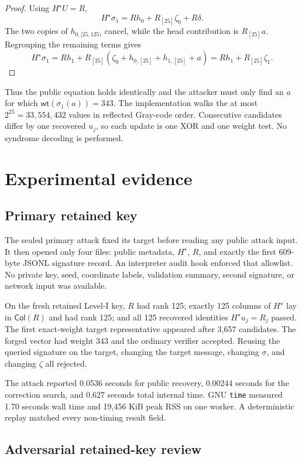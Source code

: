 \documentclass[10pt,a4paper]{article}
\newcommand{\Col}{\mathsf{Col}}
\newcommand{\wt}{\mathsf{wt}}
\begin{document}
\begin{proof}
Using $H^\star U=R$,
\[
H^\star\sigma_1
=Rh_0+R_{[25]}\zeta_0+R\delta.
\]
The two copies of $h_{0,[25,125)}$ cancel, while the head contribution is
$R_{[25]}a$. Regrouping the remaining terms gives
\[
H^\star\sigma_1
=Rh_1+R_{[25]}
 (\zeta_0+h_{0,[25]}+h_{1,[25]}+a)
=Rh_1+R_{[25]}\zeta_1.
\]
\end{proof}

Thus the public equation holds identically and the attacker must only find an
$a$ for which $\wt(\sigma_1(a))=343$. The implementation walks the at most
$2^{25}=33{,}554{,}432$ values in reflected Gray-code order. Consecutive
candidates differ by one recovered $u_j$, so each update is one XOR and one
weight test. No syndrome decoding is performed.

\section{Experimental evidence}

\subsection{Primary retained key}

The sealed primary attack fixed its target before reading any public attack
input. It then opened only four files: public metadata, $H^\star$, $R$, and
exactly the first 609-byte JSONL signature record. An interpreter audit hook
enforced that allowlist. No private key, seed, coordinate labels, validation
summary, second signature, or network input was available.

On the fresh retained Level-I key, $R$ had rank 125; exactly 125 columns of
$H^\star$ lay in $\Col(R)$ and had rank 125; and all 125 recovered identities
$H^\star u_j=R_j$ passed. The first exact-weight target representative appeared
after 3,657 candidates. The forged vector had weight 343 and the ordinary
verifier accepted. Reusing the queried signature on the target, changing the
target message, changing $\sigma$, and changing $\zeta$ all rejected.

The attack reported 0.0536 seconds for public recovery, 0.00244 seconds for
the correction search, and 0.627 seconds total internal time. GNU
\texttt{time} measured 1.70 seconds wall time and 19,456 KiB peak RSS on one
worker. A deterministic replay matched every non-timing result field.

\subsection{Adversarial retained-key review}
\end{document}
